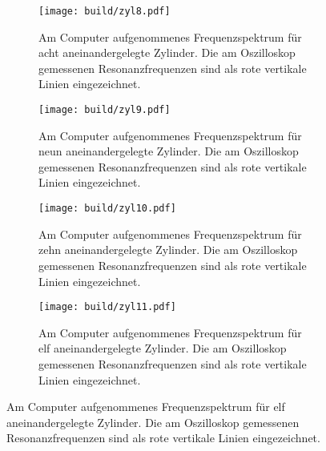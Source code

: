 \begin{figure}
  \centering
  \begin{subfigure}{0.49\textwidth}
    \centering
    \texttt{[image: build/zyl8.pdf]}
    \caption{Am Computer aufgenommenes Frequenzspektrum für acht aneinandergelegte
    Zylinder. Die am Oszilloskop gemessenen Resonanzfrequenzen sind als rote vertikale
    Linien eingezeichnet.}
    \label{fig:zyl8}
  \end{subfigure}
  \begin{subfigure}{0.49\textwidth}
    \centering
    \texttt{[image: build/zyl9.pdf]}
    \caption{Am Computer aufgenommenes Frequenzspektrum für neun aneinandergelegte
    Zylinder. Die am Oszilloskop gemessenen Resonanzfrequenzen sind als rote vertikale
    Linien eingezeichnet.}
    \label{fig:zyl9}
  \end{subfigure}
  \begin{subfigure}{0.49\textwidth}
    \centering
    \texttt{[image: build/zyl10.pdf]}
    \caption{Am Computer aufgenommenes Frequenzspektrum für zehn aneinandergelegte
    Zylinder. Die am Oszilloskop gemessenen Resonanzfrequenzen sind als rote vertikale
    Linien eingezeichnet.}
    \label{fig:zyl10}
  \end{subfigure}
  \begin{subfigure}{0.49\textwidth}
    \centering
    \texttt{[image: build/zyl11.pdf]}
    \caption{Am Computer aufgenommenes Frequenzspektrum für elf aneinandergelegte
    Zylinder. Die am Oszilloskop gemessenen Resonanzfrequenzen sind als rote vertikale
    Linien eingezeichnet.}
    \label{fig:zyl11}
  \end{subfigure}
\end{figure}

